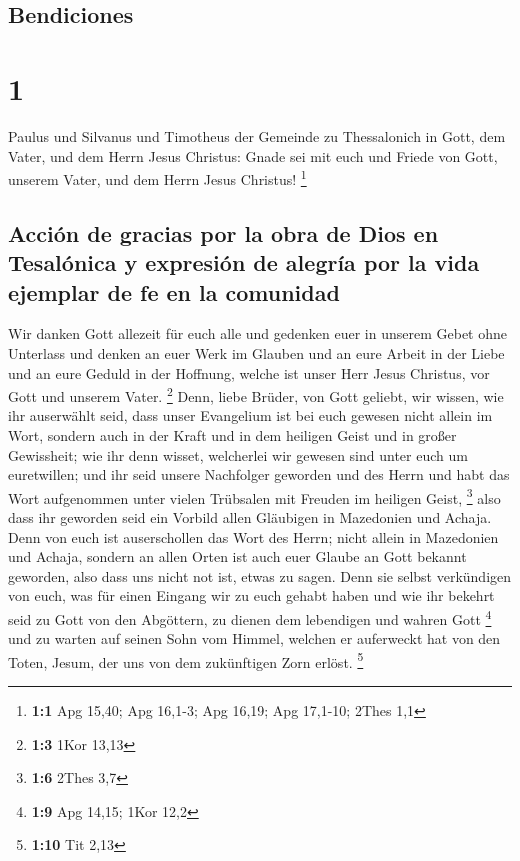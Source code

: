 \hypertarget{bendiciones}{%
\subsection{Bendiciones}\label{bendiciones}}

\hypertarget{section}{%
\section{1}\label{section}}

 Paulus und Silvanus und Timotheus der Gemeinde zu
Thessalonich in Gott, dem Vater, und dem Herrn Jesus Christus: Gnade sei
mit euch und Friede von Gott, unserem Vater, und dem Herrn Jesus
Christus! \footnote{\textbf{1:1} Apg 15,40; Apg 16,1-3; Apg 16,19; Apg
  17,1-10; 2Thes 1,1}

\hypertarget{acciuxf3n-de-gracias-por-la-obra-de-dios-en-tesaluxf3nica-y-expresiuxf3n-de-alegruxeda-por-la-vida-ejemplar-de-fe-en-la-comunidad}{%
\subsection{Acción de gracias por la obra de Dios en Tesalónica y
expresión de alegría por la vida ejemplar de fe en la
comunidad}\label{acciuxf3n-de-gracias-por-la-obra-de-dios-en-tesaluxf3nica-y-expresiuxf3n-de-alegruxeda-por-la-vida-ejemplar-de-fe-en-la-comunidad}}

 Wir danken Gott allezeit für euch alle und gedenken euer
in unserem Gebet ohne Unterlass  und denken an euer Werk
im Glauben und an eure Arbeit in der Liebe und an eure Geduld in der
Hoffnung, welche ist unser Herr Jesus Christus, vor Gott und unserem
Vater. \footnote{\textbf{1:3} 1Kor 13,13}  Denn, liebe
Brüder, von Gott geliebt, wir wissen, wie ihr auserwählt seid,
 dass unser Evangelium ist bei euch gewesen nicht allein
im Wort, sondern auch in der Kraft und in dem heiligen Geist und in
großer Gewissheit; wie ihr denn wisset, welcherlei wir gewesen sind
unter euch um euretwillen;  und ihr seid unsere Nachfolger
geworden und des Herrn und habt das Wort aufgenommen unter vielen
Trübsalen mit Freuden im heiligen Geist, \footnote{\textbf{1:6} 2Thes
  3,7}  also dass ihr geworden seid ein Vorbild allen
Gläubigen in Mazedonien und Achaja.  Denn von euch ist
auserschollen das Wort des Herrn; nicht allein in Mazedonien und Achaja,
sondern an allen Orten ist auch euer Glaube an Gott bekannt geworden,
also dass uns nicht not ist, etwas zu sagen.  Denn sie
selbst verkündigen von euch, was für einen Eingang wir zu euch gehabt
haben und wie ihr bekehrt seid zu Gott von den Abgöttern, zu dienen dem
lebendigen und wahren Gott \footnote{\textbf{1:9} Apg 14,15; 1Kor 12,2}
 und zu warten auf seinen Sohn vom Himmel, welchen er
auferweckt hat von den Toten, Jesum, der uns von dem zukünftigen Zorn
erlöst. \footnote{\textbf{1:10} Tit 2,13}

